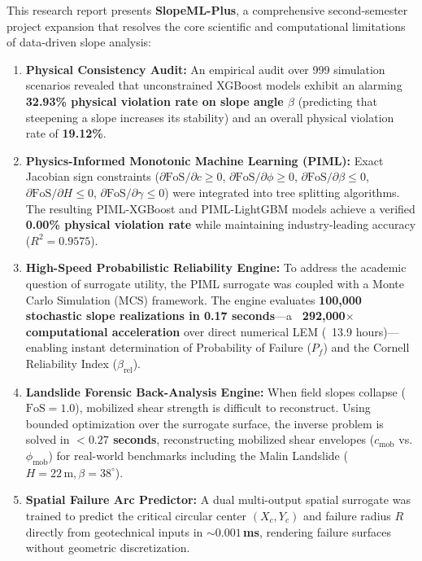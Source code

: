\documentclass[12pt,a4paper,oneside]{report}
\begin{document}
This research report presents \textbf{SlopeML-Plus}, a comprehensive second-semester project expansion that resolves the core scientific and computational limitations of data-driven slope analysis:
\begin{enumerate}
  \item \textbf{Physical Consistency Audit:} An empirical audit over 999 simulation scenarios revealed that unconstrained XGBoost models exhibit an alarming \textbf{32.93\% physical violation rate on slope angle $\beta$} (predicting that steepening a slope increases its stability) and an overall physical violation rate of \textbf{19.12\%}.
  \item \textbf{Physics-Informed Monotonic Machine Learning (PIML):} Exact Jacobian sign constraints ($\partial \text{FoS}/\partial c \ge 0$, $\partial \text{FoS}/\partial \phi \ge 0$, $\partial \text{FoS}/\partial \beta \le 0$, $\partial \text{FoS}/\partial H \le 0$, $\partial \text{FoS}/\partial \gamma \le 0$) were integrated into tree splitting algorithms. The resulting PIML-XGBoost and PIML-LightGBM models achieve a verified \textbf{0.00\% physical violation rate} while maintaining industry-leading accuracy ($R^2 = 0.9575$).
  \item \textbf{High-Speed Probabilistic Reliability Engine:} To address the academic question of surrogate utility, the PIML surrogate was coupled with a Monte Carlo Simulation (MCS) framework. The engine evaluates \textbf{100,000 stochastic slope realizations in 0.17 seconds}---a \textbf{~292,000$\times$ computational acceleration} over direct numerical LEM (~13.9 hours)---enabling instant determination of Probability of Failure ($P_f$) and the Cornell Reliability Index ($\beta_{\text{rel}}$).
  \item \textbf{Landslide Forensic Back-Analysis Engine:} When field slopes collapse ($\text{FoS} = 1.0$), mobilized shear strength is difficult to reconstruct. Using bounded optimization over the surrogate surface, the inverse problem is solved in \textbf{$< 0.27$ seconds}, reconstructing mobilized shear envelopes ($c_{\text{mob}}$ vs. $\phi_{\text{mob}}$) for real-world benchmarks including the Malin Landslide ($H=22\,\text{m}, \beta=38^\circ$).
  \item \textbf{Spatial Failure Arc Predictor:} A dual multi-output spatial surrogate was trained to predict the critical circular center $(X_c, Y_c)$ and failure radius $R$ directly from geotechnical inputs in \textbf{$\sim 0.001$\,ms}, rendering failure surfaces without geometric discretization.
\end{enumerate}
\end{document}
